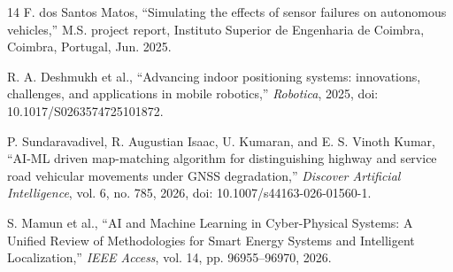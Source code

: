 \documentclass[conference]{IEEEtran}
\begin{document}
\begin{thebibliography}{14}
 F. dos Santos Matos, ``Simulating the effects of sensor failures on autonomous vehicles,'' M.S. project report, Instituto Superior de Engenharia de Coimbra, Coimbra, Portugal, Jun. 2025.

 R. A. Deshmukh et al., ``Advancing indoor positioning systems: innovations, challenges, and applications in mobile robotics,'' \emph{Robotica}, 2025, doi: 10.1017/S0263574725101872.

 P. Sundaravadivel, R. Augustian Isaac, U. Kumaran, and E. S. Vinoth Kumar, ``AI-ML driven map-matching algorithm for distinguishing highway and service road vehicular movements under GNSS degradation,'' \emph{Discover Artificial Intelligence}, vol. 6, no. 785, 2026, doi: 10.1007/s44163-026-01560-1.

 S. Mamun et al., ``AI and Machine Learning in Cyber-Physical Systems: A Unified Review of Methodologies for Smart Energy Systems and Intelligent Localization,'' \emph{IEEE Access}, vol. 14, pp. 96955--96970, 2026.

\end{thebibliography}
\end{document}
